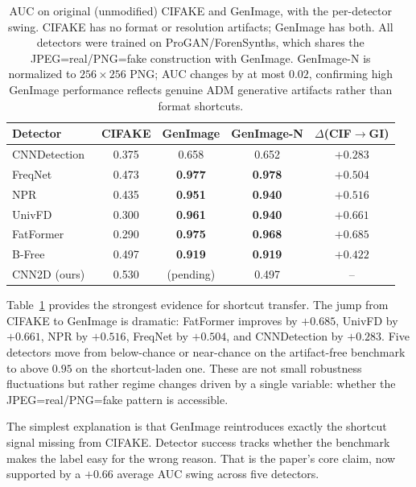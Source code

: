 \begin{table}[t]
\centering
\small
\begin{tabular}{lcccc}
\toprule
\textbf{Detector} & \textbf{CIFAKE} & \textbf{GenImage} & \textbf{GenImage-N} & \textbf{$\Delta$(CIF$\to$GI)} \\
\midrule
CNNDetection~\cite{wang2020cnn} & 0.375 & 0.658 & 0.652 & $+0.283$ \\
FreqNet~\cite{freqnet}          & 0.473 & \textbf{0.977} & \textbf{0.978} & $+0.504$ \\
NPR~\cite{npr}                  & 0.435 & \textbf{0.951} & \textbf{0.940} & $+0.516$ \\
UnivFD~\cite{univfd}            & 0.300 & \textbf{0.961} & \textbf{0.940} & $+0.661$ \\
FatFormer~\cite{fatformer}      & 0.290 & \textbf{0.975} & \textbf{0.968} & $+0.685$ \\
B-Free~\cite{bfree}             & 0.497 & \textbf{0.919} & \textbf{0.919} & $+0.422$ \\
CNN2D (ours)                    & 0.530 & (pending)       & 0.497           & --        \\
\bottomrule
\end{tabular}
\caption{AUC on original (unmodified) CIFAKE and GenImage, with the per-detector swing. CIFAKE has no format or resolution artifacts; GenImage has both. All detectors were trained on ProGAN/ForenSynths, which shares the JPEG=real/PNG=fake construction with GenImage. GenImage-N is normalized to $256\times256$ PNG; AUC changes by at most $0.02$, confirming high GenImage performance reflects genuine ADM generative artifacts rather than format shortcuts.}
\label{tab:genimage}
\end{table}

Table~\ref{tab:genimage} provides the strongest evidence for shortcut transfer.
The jump from CIFAKE to GenImage is dramatic: FatFormer improves by $+0.685$, UnivFD by $+0.661$, NPR by $+0.516$, FreqNet by $+0.504$, and CNNDetection by $+0.283$.
Five detectors move from below-chance or near-chance on the artifact-free benchmark to above $0.95$ on the shortcut-laden one.
These are not small robustness fluctuations but rather regime changes driven by a single variable: whether the JPEG=real/PNG=fake pattern is accessible.

The simplest explanation is that GenImage reintroduces exactly the shortcut signal missing from CIFAKE.
Detector success tracks whether the benchmark makes the label easy for the wrong reason.
That is the paper's core claim, now supported by a $+0.66$ average AUC swing across five detectors.

